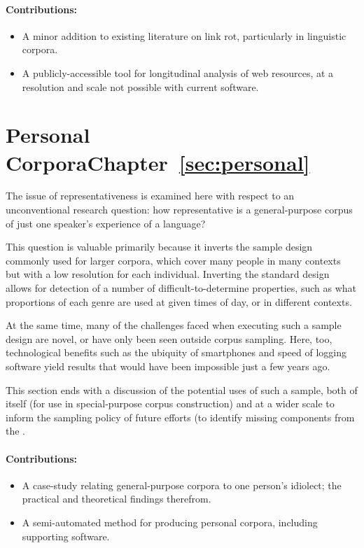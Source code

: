 \paragraph{Contributions:}
\begin{itemize}
    \item A minor addition to existing literature on link rot, particularly in linguistic corpora.
    \item A publicly-accessible tool for longitudinal analysis of web resources, at a resolution and scale not possible with current software.
\end{itemize}

\section*{Personal Corpora\hfill{}Chapter~\ref{sec:personal}}
The issue of representativeness is examined here with respect to an unconventional research question: how representative is a general-purpose corpus of just one speaker's experience of a language?

This question is valuable primarily because it inverts the sample design commonly used for larger corpora, which cover many people in many contexts but with a low resolution for each individual.
Inverting the standard design allows for detection of a number of difficult-to-determine properties, such as what proportions of each genre are used at given times of day, or in different contexts.

At the same time, many of the challenges faced when executing such a sample design are novel, or have only been seen outside corpus sampling.  Here, too, technological benefits such as the ubiquity of smartphones and speed of logging software yield results that would have been impossible just a few years ago.

This section ends with a discussion of the potential uses of such a sample, both of itself (for use in special-purpose corpus construction) and at a wider scale to inform the sampling policy of future efforts (to identify missing components from the .

\paragraph{Contributions:}
\begin{itemize}
    \item A case-study relating general-purpose corpora to one person's idiolect; the practical and theoretical findings therefrom.
    \item A semi-automated method for producing personal corpora, including supporting software.
\end{itemize}


